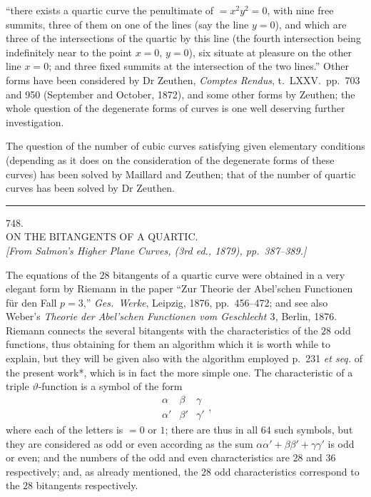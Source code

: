 \documentclass[11pt]{article}
\begin{document}
\bigskip
\noindent
``there exists a quartic curve the penultimate of $= x^{2} y^{2} = 0$, with
nine free summits, three of them on one of the lines (say the line $y = 0$),
and which are three of the intersections of the quartic by this line (the
fourth intersection being indefinitely near to the point $x = 0$, $y = 0$),
six situate at pleasure on the other line $x = 0$; and three fixed summits
at the intersection of the two lines.'' Other forms have been considered by
Dr Zeuthen, \emph{Comptes Rendus}, t.\ LXXV.\ pp.\ 703 and 950 (September
and October, 1872), and some other forms by Zeuthen; the whole question of
the degenerate forms of curves is one well deserving further investigation.

\medskip
\noindent
The question of the number of cubic curves satisfying given elementary
conditions (depending as it does on the consideration of the degenerate
forms of these curves) has been solved by Maillard and Zeuthen; that of the
number of quartic curves has been solved by Dr Zeuthen.

\bigskip
\bigskip
\hrule
\bigskip

\begin{center}
\textsc{748.}\\[6pt]
\textsc{ON THE BITANGENTS OF A QUARTIC.}\\[6pt]
\textit{[From Salmon's \emph{Higher Plane Curves}, (3rd ed., 1879), pp.\ 387--389.]}
\end{center}

\medskip
\noindent
The equations of the $28$ bitangents of a quartic curve were obtained in a
very elegant form by Riemann in the paper ``Zur Theorie der Abel'schen
Functionen f\"ur den Fall $p = 3$,'' \emph{Ges.\ Werke}, Leipzig, 1876,
pp.\ 456--472; and see also Weber's \emph{Theorie der Abel'schen Functionen
vom Geschlecht $3$,} Berlin, 1876. Riemann connects the several bitangents
with the characteristics of the $28$ odd functions, thus obtaining for them
an algorithm which it is worth while to explain, but they will be given also
with the algorithm employed p.\ 231 \emph{et seq.} of the present work*,
which is in fact the more simple one. The characteristic of a triple
$\vartheta$-function is a symbol of the form
\[
  \begin{matrix} \alpha & \beta & \gamma \\ \alpha' & \beta' & \gamma' \end{matrix},
\]
where each of the letters is $= 0$ or $1$; there are thus in all $64$ such
symbols, but they are considered as odd or even according as the sum
$\alpha\alpha' + \beta\beta' + \gamma\gamma'$ is odd or even; and the
numbers of the odd and even characteristics are $28$ and $36$ respectively;
and, as already mentioned, the $28$ odd characteristics correspond to the
$28$ bitangents respectively.
\end{document}
